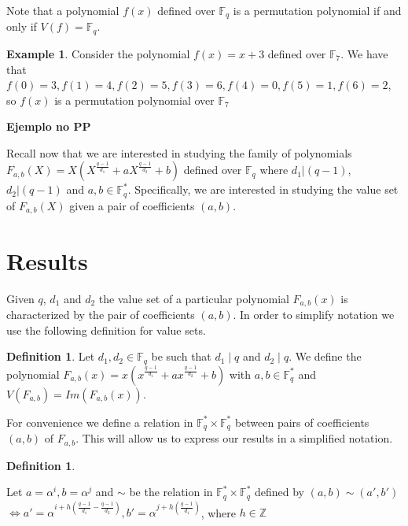 \documentclass{article}
\theoremstyle{definition}
\newtheorem{definition}[theorem]{Definition}
\newtheorem{example}[theorem]{Example}
\theoremstyle{remark}
\numberwithin{equation}{section}
\begin{document}
Note that a polynomial $f(x)$ defined over $\mathbb{F}_{q}$ is a permutation polynomial if and only if  $V(f) = \mathbb{F}_{q}$.


\begin{example}
  Consider the polynomial $f(x) = x+3$ defined over $\mathbb{F}_{7}$. We have that $f(0) = 3, f(1) = 4, f(2) = 5, f(3) = 6, f(4) = 0, f(5) = 1, f(6) = 2$, so $f(x)$ is a permutation polynomial over $\mathbb{F}_{7}$
\end{example}

\textbf{Ejemplo no PP}

Recall now that we are interested in studying the family of polynomials $F_{a,b}(X) = X(X^{\frac{q-1}{d_1}} + aX^{\frac{q-1}{d_2}} +b)$ defined over $\mathbb{F}_q$ where $d_1 | (q-1)$, $d_2 | (q-1)$ and $a,b \in \mathbb{F}_q^*$. Specifically, we are interested in studying the value set of $F_{a,b}(X)$ given a pair of coefficients $(a,b)$.

\section{Results}

Given $q$, $d_1$ and $d_2$ the value set of a particular polynomial $F_{a,b}(x)$ is characterized by the pair of coefficients $(a,b)$. In order to simplify notation we use the following definition for value sets.

\begin{definition}
  Let $d_1, d_2 \in \mathbb{F}_q$ be such that $d_1 \mid q$ and $d_2 \mid q$. We define the polynomial $F_{a,b}(x) = x(x^{\frac{q-1}{d_1}} + ax^{\frac{q-1}{d_2}} +b)$ with $a,b \in \mathbb{F}_q^{*}$ and $V(F_{a,b}) = Im(F_{a,b}(x))$.
\end{definition}

For convenience we define a relation in $\mathbb{F}_q^* \times \mathbb{F}_q^*$ between pairs of coefficients $(a,b)$ of $F_{a,b}$. This will allow us to express our results in a simplified notation.

\begin{definition}\label{relacion}

  Let $a = \alpha^i, b = \alpha^j$ and $\sim$ be the relation in $\mathbb{F}_q^* \times \mathbb{F}_q^*$ defined by $(a,b) \sim (a', b')$ 
  $\Longleftrightarrow a' = \alpha^{i+h(\frac{q-1}{d_1} - \frac{q-1}{d_2})}, b' = \alpha^{j+h(\frac{q-1}{d_1})}$, where $h \in \mathbb{Z}$

\end{definition}
\end{document}
